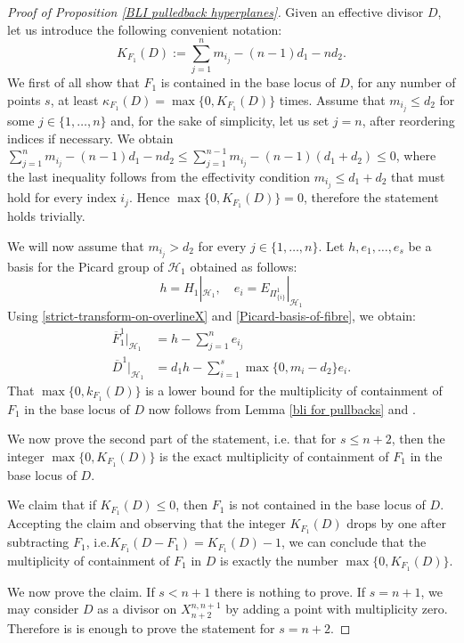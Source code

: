 \documentclass[a4paper,11pt]{article}
\begin{document}
\begin{proof}[Proof of Proposition \ref{BLI pulledback hyperplanes}]
Given an effective divisor $D$, let us introduce the following convenient notation:$$K_{F_1}(D):=\sum_{j=1}^n m_{i_j}-(n-1)d_1-nd_2.$$
We first of all show that $F_1$ is contained in the base locus of $D$, for any number of points $s$,  at least $\kappa_{F_1}(D)=\max\{0,K_{F_1}(D)\}$ times. Assume that $m_{i_j}\le d_2$ for some $j\in\{1,\dots,n\}$ and, for the sake of simplicity,  let us set $j=n$, after reordering indices if necessary. We obtain 
$\sum_{j=1}^n m_{i_j}-(n-1)d_1-nd_2
\leq\sum_{j=1}^{n-1} m_{i_j}-(n-1)(d_1+d_2)\le0$, where the last inequality follows from  the effectivity condition $m_{i_j}\le d_1+d_2$ that must hold for every index $i_j$. Hence $\max\{0,K_{F_1}(D)\}=0$, therefore the statement holds trivially.

We will now assume that   $m_{i_j}>d_2$ for every $j\in\{1,\dots,n\}$.
Let $h,e_1,\dots,e_s$ be a basis for the Picard group of $\mathcal{H}_1$ obtained as follows:
\begin{equation}\label{Picard-basis-of-fibre}
h=H_1|_{\mathcal{H}_1}, \quad e_i=E_{\Pi^1_{\{i\}}}|_{\mathcal{H}_1}
\end{equation}
Using \eqref{strict-transform-on-overlineX} and \eqref{Picard-basis-of-fibre}, we obtain:
\begin{align*}
{\overline{F}^1_1}|_{\mathcal{H}_1}&=h-\sum_{j=1}^ne_{i_j}
\\
{\overline{D}^1}|_{\mathcal{H}_1}&=d_1h-\sum_{i=1}^s\max\{0,m_i-d_2\}e_{i}.
\end{align*}
That $\max\{0,k_{F_1}(D)\}$ is a lower bound for the multiplicity of containment of $F_1$ in the base locus of $D$ now follows from Lemma \ref{bli for pullbacks} and \cite[Lemma 2.1]{BDP-TAMS}. 

We now prove the second part of the statement, i.e. that for $s\le n+2$, then the integer $\max\{0,K_{F_1}(D)\}$  is the exact multiplicity of containment of $F_1$ in the base locus of $D$.

We claim that if $K_{F_1}(D)\le0$, then $F_1$ is not contained in the base locus of $D$. Accepting the claim and observing that the integer $K_{F_1}(D)$ drops by one after subtracting $F_1$, i.e.$K_{F_1}(D-F_1)=K_{F_1}(D)-1$, we can conclude that the multiplicity of containment of $F_1$ in $D$ is exactly the number $\max\{0,K_{F_1}(D)\}$.

We now prove the claim. If $s<n+1$ there is nothing to prove. If $s=n+1$, we may consider $D$ as a divisor on $X^{n,n+1}_{n+2}$ by adding a point with multiplicity zero. Therefore is is enough to prove the statement for $s=n+2$. 



\end{proof}
\end{document}
